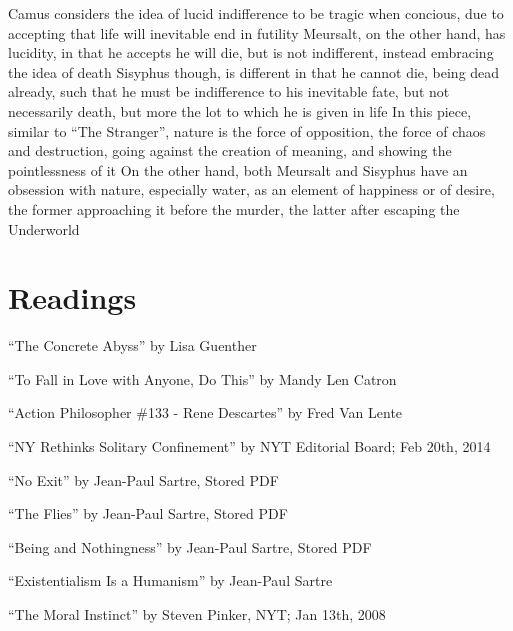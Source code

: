 \documentclass[11 pt, twoside]{article}
\newenvironment{outline*}
{
	\begin{outline}[enumerate]
	}
	{\end{outline}
}
\begin{document}
\begin{outline*}
\3 Camus considers the idea of lucid indifference to be tragic when concious, due to accepting that life will inevitable end in futility
\3 Meursalt, on the other hand, has lucidity, in that he accepts he will die, but is not indifferent, instead embracing the idea of death
\3 Sisyphus though, is different in that he cannot die, being dead already, such that he must be indifference to his inevitable fate, but not necessarily death, but more the lot to which he is given in life
\2 In this piece, similar to ``The Stranger'', nature is the force of opposition, the force of chaos and destruction, going against the creation of meaning, and showing the pointlessness of it
\3 On the other hand, both Meursalt and Sisyphus have an obsession with nature, especially water, as an element of happiness or of desire, the former approaching it before the murder, the latter after escaping the Underworld
\end{outline*}
\section{Readings}
\begin{enumerate}
\hypertarget{1}{\item ``The Concrete Abyss'' by Lisa Guenther}
\hypertarget{2}{\item ``To Fall in Love with Anyone, Do This'' by Mandy Len Catron}
\hypertarget{3}{\item ``Action Philosopher \#133 - Rene Descartes'' by Fred Van Lente}
\hypertarget{4}{\item ``NY Rethinks Solitary Confinement'' by NYT Editorial Board; Feb 20th, 2014}
\hypertarget{5}{\item ``No Exit'' by Jean-Paul Sartre, Stored PDF}
\hypertarget{6}{\item ``The Flies'' by Jean-Paul Sartre, Stored PDF}
\hypertarget{7}{\item ``Being and Nothingness'' by Jean-Paul Sartre, Stored PDF}
\hypertarget{8}{\item ``Existentialism Is a Humanism'' by Jean-Paul Sartre}
\hypertarget{9}{\item ``The Moral Instinct'' by Steven Pinker, NYT; Jan 13th, 2008}
\end{enumerate}
\end{document}
